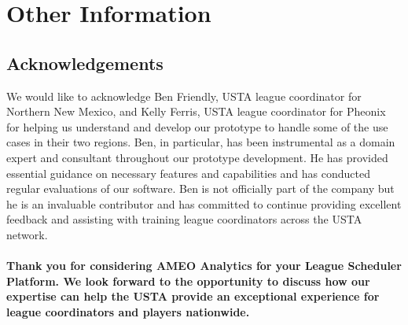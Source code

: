 \section{Other Information}










\subsection*{Acknowledgements}

We would like to acknowledge Ben Friendly, USTA league coordinator for Northern New Mexico, and Kelly Ferris, USTA league coordinator for Pheonix for helping us understand and develop our prototype to handle some of the use cases in their two regions. Ben, in particular, has been instrumental as a domain expert and consultant throughout our prototype development. He has provided essential guidance on necessary features and capabilities and has conducted regular evaluations of our software. Ben is not officially part of the company but he is an invaluable contributor and has committed to continue providing excellent feedback and assisting with training league coordinators across the USTA network.
\\ 
\\ 
\noindent\textbf{Thank you for considering AMEO Analytics for your League Scheduler Platform. We look forward to the opportunity to discuss how our expertise can help the USTA provide an exceptional experience for league coordinators and players nationwide.}

